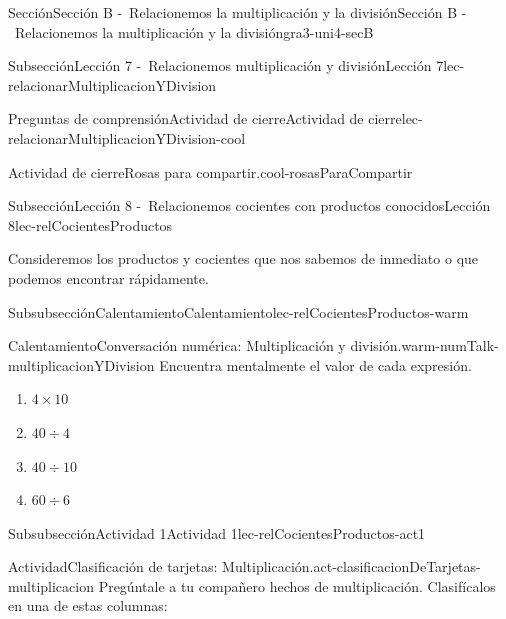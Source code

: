 \documentclass[twoside,10pt,]{article}
\begin{document}
\begin{sectionptx}{Sección}{Sección B -~Relacionemos la multiplicación y la división}{}{Sección B -~Relacionemos la multiplicación y la división}{}{}{gra3-uni4-secB}
\begin{subsectionptx}{Subsección}{Lección 7 -~Relacionemos multiplicación y división}{}{Lección 7}{}{}{lec-relacionarMultiplicacionYDivision}
\begin{reading-questions-subsubsection}{Preguntas de comprensión}{Actividad de cierre}{}{Actividad de cierre}{}{}{lec-relacionarMultiplicacionYDivision-cool}
\begin{project}{Actividad de cierre}{Rosas para compartir.}{cool-rosasParaCompartir}
\end{project}%
\end{reading-questions-subsubsection}
\end{subsectionptx}
%
%
\typeout{************************************************}
\typeout{************************************************}
%
\begin{subsectionptx}{Subsección}{Lección 8 -~Relacionemos cocientes con productos conocidos}{}{Lección 8}{}{}{lec-relCocientesProductos}
\begin{introduction}{}%
Consideremos los productos y cocientes que nos sabemos de inmediato o que podemos encontrar rápidamente.%
\end{introduction}%
%
%
\typeout{************************************************}
\typeout{************************************************}
%
\begin{subsubsectionptx}{Subsubsección}{Calentamiento}{}{Calentamiento}{}{}{lec-relCocientesProductos-warm}
\begin{exploration}{Calentamiento}{Conversación numérica: Multiplicación y división.}{warm-numTalk-multiplicacionYDivision}%
Encuentra mentalmente el valor de cada expresión.%
%
\begin{enumerate}[label={\Alph*.}]
\item{}\(\displaystyle 4\times 10\)%
\item{}\(\displaystyle 40\div 4\)%
\item{}\(\displaystyle 40\div 10\)%
\item{}\(\displaystyle 60\div 6\)%
\end{enumerate}
\end{exploration}%
\end{subsubsectionptx}
%
%
\typeout{************************************************}
\typeout{************************************************}
%
\begin{subsubsectionptx}{Subsubsección}{Actividad 1}{}{Actividad 1}{}{}{lec-relCocientesProductos-act1}
\begin{activity}{Actividad}{Clasificación de tarjetas: Multiplicación.}{act-clasificacionDeTarjetas-multiplicacion}%
Pregúntale a tu compañero hechos de multiplicación. Clasifícalos en una de estas columnas:%
\begin{image}{0}{1}{0}{}%

\end{image}
\end{activity}
\end{subsubsectionptx}
\end{subsectionptx}
\end{sectionptx}
\end{document}
